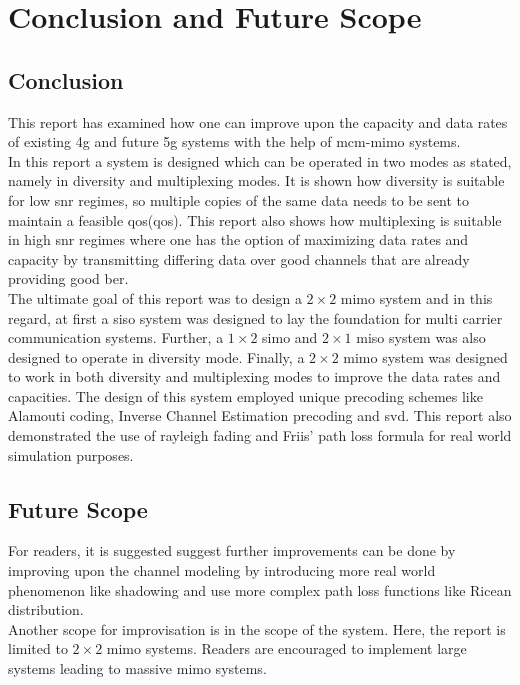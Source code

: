 \chapter{Conclusion and Future Scope}
\section{Conclusion}
This report has examined how one can improve upon the capacity and data rates of existing \acrshort{4g} and future \acrshort{5g} systems with the help of \acrshort{mcm}-\acrshort{mimo} systems.\\

In this report a system is designed which can be operated in two modes as stated, namely in diversity and multiplexing modes. It is shown how diversity is suitable for low \acrshort{snr} regimes, so multiple copies of the same data needs to be sent to maintain a feasible \acrlong{qos}(\acrshort{qos}). This report also shows how multiplexing is suitable in high \acrshort{snr} regimes where one has the option of maximizing data rates and capacity by transmitting differing data over good channels that are already providing good \acrshort{ber}.\\


The ultimate goal of this report was to design a $2 \times 2$ \acrshort{mimo} system and in this regard, at first a \acrshort{siso} system was designed to lay the foundation for multi carrier communication systems. Further, a $1 \times 2$ \acrshort{simo} and $2 \times 1$ \acrshort{miso} system was also designed to operate in diversity mode. Finally, a $2 \times 2$ \acrshort{mimo} system was designed to work in both diversity and multiplexing modes to improve the data rates and capacities. The design of this system employed unique precoding schemes like Alamouti coding, Inverse Channel Estimation precoding and \acrshort{svd}. This report also demonstrated the use of \gls{rayleigh fading} and Friis' path loss formula for real world simulation purposes.

\section{Future Scope}
For readers, it is suggested suggest further improvements can be done by improving upon the channel modeling by introducing more real world phenomenon like shadowing and use more complex path loss functions like Ricean distribution.\\
Another scope for improvisation is in the scope of the system. Here, the report is limited to $2 \times 2$ \acrshort{mimo} systems. Readers are encouraged to implement large systems leading to massive \acrshort{mimo} systems.\\

